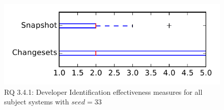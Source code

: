 
\begin{figure}
\centering
\includegraphics[height=0.4\textheight]{figures/dit_seed/rq1_tiny_33}
\caption{RQ 3.4.1: Developer Identification effectiveness measures for all subject systems with $seed=33$}
\label{fig:dit_seed:rq1:tiny}
\end{figure}
